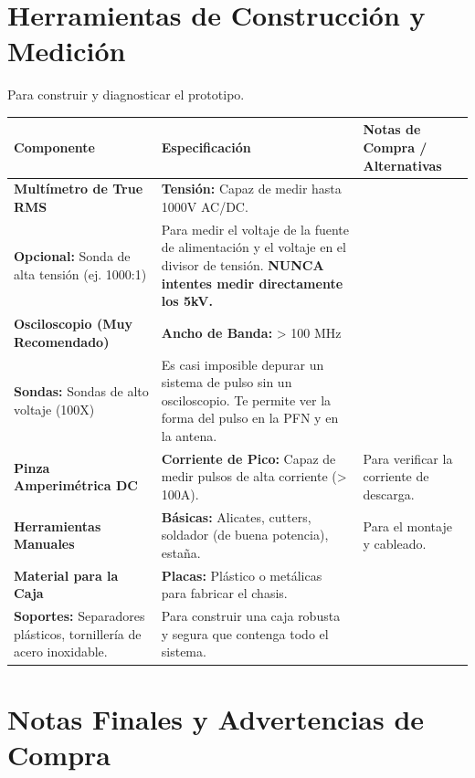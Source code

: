 \documentclass[11pt, a4paper]{article}
\begin{document}
\newpage
\section{Herramientas de Construcción y Medición}

Para construir y diagnosticar el prototipo.

\begin{longtable}{|p{3.5cm}|p{4.5cm}|p{6cm}|}
\hline
\rowcolor[gray]{0.9}
\textbf{Componente} & \textbf{Especificación} & \textbf{Notas de Compra / Alternativas} \\
\hline
\endhead

\textbf{Multímetro de True RMS} & 
\textbf{Tensión:} Capaz de medir hasta 1000V AC/DC. \\
\textbf{Opcional:} Sonda de alta tensión (ej. 1000:1) & 
Para medir el voltaje de la fuente de alimentación y el voltaje en el divisor de tensión. \textbf{NUNCA intentes medir directamente los 5kV.} \\
\hline

\textbf{Osciloscopio (Muy Recomendado)} & 
\textbf{Ancho de Banda:} > 100 MHz \\
\textbf{Sondas:} Sondas de alto voltaje (100X) & 
Es casi imposible depurar un sistema de pulso sin un osciloscopio. Te permite ver la forma del pulso en la PFN y en la antena. \\
\hline

\textbf{Pinza Amperimétrica DC} & 
\textbf{Corriente de Pico:} Capaz de medir pulsos de alta corriente (> 100A). & 
Para verificar la corriente de descarga. \\
\hline

\textbf{Herramientas Manuales} & 
\textbf{Básicas:} Alicates, cutters, soldador (de buena potencia), estaña. & 
Para el montaje y cableado. \\
\hline

\textbf{Material para la Caja} & 
\textbf{Placas:} Plástico o metálicas para fabricar el chasis. \\
\textbf{Soportes:} Separadores plásticos, tornillería de acero inoxidable. & 
Para construir una caja robusta y segura que contenga todo el sistema. \\
\hline

\end{longtable}

\newpage
\section*{Notas Finales y Advertencias de Compra}
\end{document}
